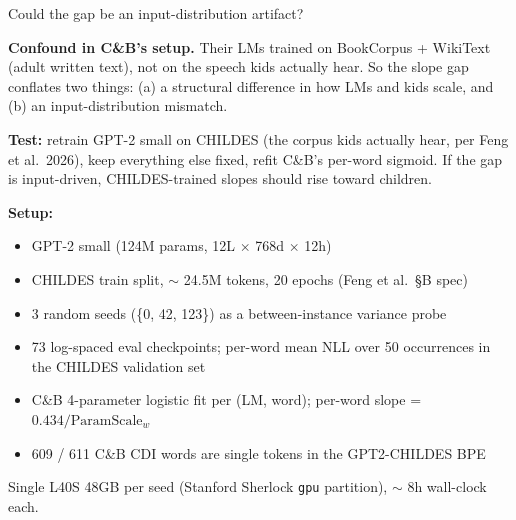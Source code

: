 \documentclass[
  ignorenonframetext,
  aspectratio=169,
  t]{beamer}
\providecommand{\tightlist}{%
  \setlength{\itemsep}{0pt}\setlength{\parskip}{0pt}}
\begin{document}
\begin{frame}{Could the gap be an input-distribution artifact?}
\label{could-the-gap-be-an-input-distribution-artifact}
\small

\textbf{Confound in C\&B's setup.} Their LMs trained on BookCorpus +
WikiText (adult written text), not on the speech kids actually hear. So
the slope gap conflates two things: (a) a structural difference in how
LMs and kids scale, and (b) an input-distribution mismatch.

\vspace{0.6em}

\textbf{Test:} retrain GPT-2 small on CHILDES (the corpus kids actually
hear, per Feng et al.~2026), keep everything else fixed, refit C\&B's
per-word sigmoid. If the gap is input-driven, CHILDES-trained slopes
should rise toward children.

\vspace{0.6em}

\textbf{Setup:}

\begin{itemize}
\tightlist
\item
  GPT-2 small (124M params, 12L \(\times\) 768d \(\times\) 12h)
\item
  CHILDES train split, \(\sim\) 24.5M tokens, 20 epochs (Feng et al.~§B
  spec)
\item
  3 random seeds (\{0, 42, 123\}) as a between-instance variance probe
\item
  73 log-spaced eval checkpoints; per-word mean NLL over 50 occurrences
  in the CHILDES validation set
\item
  C\&B 4-parameter logistic fit per (LM, word); per-word slope =
  \(0.434 / \mathrm{ParamScale}_w\)
\item
  609 / 611 C\&B CDI words are single tokens in the GPT2-CHILDES BPE
\end{itemize}

\vspace{0.5em}

\begin{footnotesize}
Single L40S 48GB per seed (Stanford Sherlock \texttt{gpu} partition), $\sim$ 8h wall-clock each.
\end{footnotesize}
\end{frame}
\end{document}

